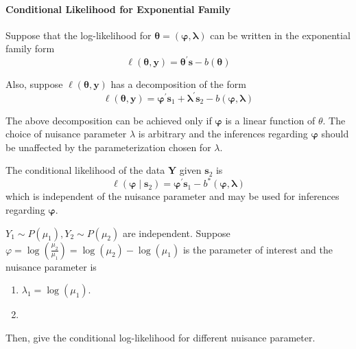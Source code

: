 \begin{example}

\end{example}

\paragraph*{Conditional Likelihood for Exponential Family}

Suppose that the log-likelihood for $\boldsymbol{\theta}=\left(\boldsymbol{\varphi},\boldsymbol{\lambda}\right)$ can be written in the exponential family form
\begin{equation}
    \ell\left(\boldsymbol{\theta},\mathbf{y}\right)=\boldsymbol{\theta}^{\prime}\mathbf{s}-b\left(\boldsymbol{\theta}\right)
\end{equation}

Also, suppose $\ell\left(\boldsymbol{\theta},\mathbf{y}\right)$ has a decomposition of the form
\begin{equation}
    \ell\left(\boldsymbol{\theta},\mathbf{y}\right)=\boldsymbol{\varphi}^{\prime}\mathbf{s}_{1}+\boldsymbol{\lambda}^{\prime}\mathbf{s}_{2}-b(\boldsymbol{\varphi},\boldsymbol{\lambda})
\end{equation}

\begin{remark}
    The above decomposition can be achieved only if $\boldsymbol{\varphi}$ is a linear function of $\theta$. The choice of nuisance parameter $\lambda$ is arbitrary and the inferences regarding $\boldsymbol{\varphi}$ should be unaffected by the parameterization chosen for $\lambda$.
\end{remark}

The conditional likelihood of the data $\mathbf{Y}$ given $\mathbf{s}_{2}$ is
\begin{equation}
    \ell\left(\boldsymbol{\varphi}\mid\mathbf{s}_{2}\right)=\boldsymbol{\varphi}^{\prime}\mathbf{s}_{1}-b^{*}\left(\boldsymbol{\varphi},\boldsymbol{\lambda}\right)
\end{equation}
which is independent of the nuisance parameter and may be used for inferences regarding $\boldsymbol{\varphi}$.

\begin{example}
    $Y_{1}\sim P\left(\mu_{1}\right),Y_{2}\sim P\left(\mu_{2}\right)$ are independent. Suppose $\varphi=\log\left(\frac{\mu_{2}}{\mu_{1}}\right)=\log\left(\mu_{2}\right)-\log\left(\mu_{1}\right)$ is the parameter of interest and the nuisance parameter is
    \begin{enumerate}
        \item $\lambda_{1}=\log\left(\mu_{1}\right)$.
        \item
    \end{enumerate}
    Then, give the conditional log-likelihood for different nuisance parameter.
\end{example}

